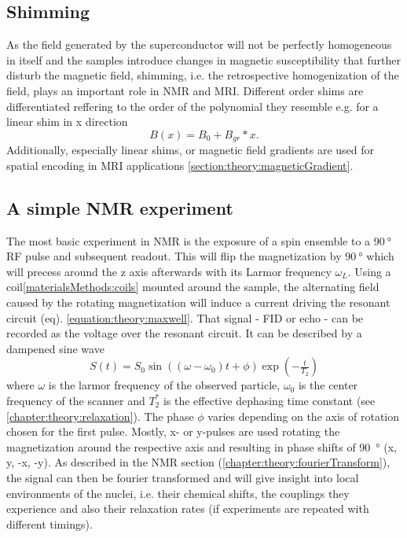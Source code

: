         \subsection{Shimming}
            As the field generated by the superconductor will not be perfectly homogeneous in itself and the samples introduce changes in magnetic susceptibility that further disturb the magnetic field, shimming, i.e. the retrospective homogenization of the field, plays an important role in NMR and MRI. Different order shims are differentiated reffering to the order of the polynomial they resemble e.g. for a linear shim in x direction
            \begin{equation}
                B(x) = B_0 + B_{gr} * x.
            \end{equation}
            Additionally, especially linear shims, or magnetic field gradients are used for spatial encoding in MRI applications \ref{section:theory:magneticGradient}.
        \subsection{A simple NMR experiment}
        The most basic experiment in NMR is the exposure of a spin ensemble to a $\SI{90}{\degree}$ RF pulse and subsequent readout. This will flip the magnetization by $\SI{90}{\degree}$ which will precess around the z axis afterwards with its Larmor frequency $\omega_L$. Using a coil\ref{materialsMethods:coils} mounted around the sample, the alternating field caused by the rotating magnetization will induce a current driving the resonant circuit (eq). \ref{equation:theory:maxwell}. That signal - FID or echo - can be recorded as the voltage over the resonant circuit. It can be described by a dampened sine wave
            \begin{equation}
                S(t) = S_0 \sin((\omega - \omega_0)  t + \phi) \exp(-\tfrac{t}{T_2})
            \end{equation}
            where $\omega$ is the larmor frequency of the observed particle, $\omega_0$ is the center frequency of the scanner and $T_2^*$ is the effective dephasing time constant (see \ref{chapter:theory:relaxation}). The phase $\phi$ varies depending on the axis of rotation chosen for the first pulse. Mostly, x- or y-pulses are used rotating the magnetization around the respective axis and resulting in phase shifts of \SI{90}{\degree} (x, y, -x, -y). As described in the NMR section (\ref{chapter:theory:fourierTransform}), the signal can then be fourier transformed and will give insight into local environments of the nuclei, i.e. their chemical shifts, the couplings they experience and also their relaxation rates (if experiments are repeated with different timings). 
